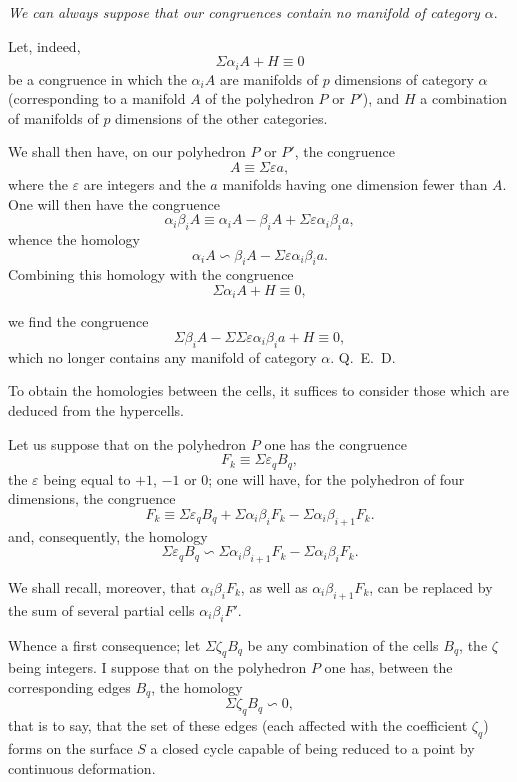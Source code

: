 \documentclass{article}
\begin{document}
\emph{We can always suppose that our congruences contain no manifold of category $\alpha$}.

Let, indeed,
\[ \Sigma \alpha_{i}A + H \equiv 0 \]
be a congruence in which the $\alpha_{i}A$ are manifolds of $p$ dimensions of category $\alpha$ (corresponding to a manifold $A$ of the polyhedron $P$ or $P'$), and $H$ a combination of manifolds of $p$ dimensions of the other categories.

We shall then have, on our polyhedron $P$ or $P'$, the congruence
\[ A \equiv \Sigma \varepsilon a, \]
where the $\varepsilon$ are integers and the $a$ manifolds having one dimension fewer than $A$. One will then have the congruence
\[ \alpha_{i}\beta_{i}A \equiv \alpha_{i}A - \beta_{i}A + \Sigma \varepsilon \alpha_{i}\beta_{i}a, \]
whence the homology
\[ \alpha_{i}A \backsim \beta_{i}A - \Sigma \varepsilon \alpha_{i}\beta_{i}a. \]
Combining this homology with the congruence
\[ \Sigma \alpha_{i}A + H \equiv 0, \]

we find the congruence
\[ \Sigma \beta_{i}A - \Sigma \Sigma \varepsilon \alpha_{i}\beta_{i}a + H \equiv 0, \]
which no longer contains any manifold of category $\alpha$. Q.~E.~D.

To obtain the homologies between the cells, it suffices to consider those which are deduced from the hypercells.

Let us suppose that on the polyhedron $P$ one has the congruence
\[ F_{k} \equiv \Sigma \varepsilon_{q} B_{q}, \]
the $\varepsilon$ being equal to $+1$, $-1$ or 0; one will have, for the polyhedron of four dimensions, the congruence
\[ F_{k} \equiv \Sigma \varepsilon_{q} B_{q} + \Sigma \alpha_{i}\beta_{i}F_{k} - \Sigma \alpha_{i}\beta_{i+1}F_{k}. \]
and, consequently, the homology
\[ \Sigma \varepsilon_{q} B_{q} \backsim \Sigma \alpha_{i}\beta_{i+1}F_{k} - \Sigma \alpha_{i}\beta_{i}F_{k}. \tag{1} \]

We shall recall, moreover, that $\alpha_{i}\beta_{i}F_{k}$, as well as $\alpha_{i}\beta_{i+1}F_{k}$, can be replaced by the sum of several partial cells $\alpha_{i}\beta_{i}F'$.

Whence a first consequence; let $\Sigma \zeta_{q} B_{q}$ be any combination of the cells $B_{q}$, the $\zeta$ being integers. I suppose that on the polyhedron $P$ one has, between the corresponding edges $B_{q}$, the homology
\[ \Sigma \zeta_{q} B_{q} \backsim 0, \]
that is to say, that the set of these edges (each affected with the coefficient $\zeta_{q}$) forms on the surface $S$ a closed cycle capable of being reduced to a point by continuous deformation.
\end{document}
